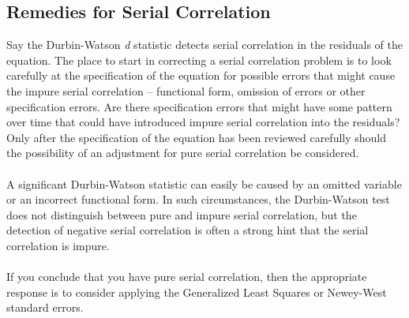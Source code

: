 \documentclass[11pt]{article}
\begin{document}
\subsection{Remedies for Serial Correlation}
Say the Durbin-Watson \textit{d} statistic detects serial correlation in the residuals of the equation. The place to start in correcting a serial correlation problem is to look carefully at the specification of the equation for possible errors that might cause the impure serial correlation -- functional form, omission of errors or other specification errors. Are there specification errors that might have some pattern over time that could have introduced impure serial correlation into the residuals? Only after the specification of the equation has been reviewed carefully should the possibility of an adjustment for pure serial correlation be considered.\\ \\
A significant Durbin-Watson statistic can easily be caused by an omitted variable or an incorrect functional form. In such circumstances, the Durbin-Watson test does not distinguish between pure and impure serial correlation, but the detection of negative serial correlation is often a strong hint that the serial correlation is impure. \\ \\
If you conclude that you have pure serial correlation, then the appropriate response is to consider applying the Generalized Least Squares or Newey-West standard errors.
\end{document}
